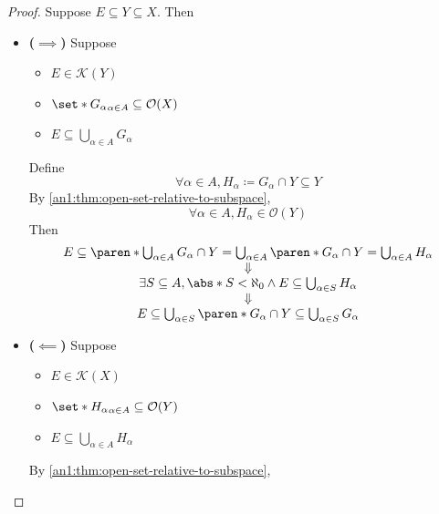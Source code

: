 \begin{proof}
  Suppose $E \subseteq Y \subseteq X$. Then
  \begin{itemize}
    \item \textbf{($\implies$)} Suppose
          \begin{itemize}
            \item $E \in \mathcal{K}(Y)$
            \item $\set*{G_{\alpha}}_{\alpha \in A} \subseteq \mathcal{O}(X)$
            \item $E \subseteq \bigcup_{\alpha \in A} G_{\alpha}$
          \end{itemize}
          Define
          \[
            \forall \alpha \in A, H_{\alpha} \coloneqq G_{\alpha} \cap Y \subseteq Y
          \]
          By \cref{an1:thm:open-set-relative-to-subspace},
          \[
            \forall \alpha \in A, H_{\alpha} \in \mathcal{O}(Y)
          \]
          Then
          \[
            \begin{array}{c}
              E \subseteq \paren*{\bigcup_{\alpha \in A} G_{\alpha}} \cap Y =
              \bigcup_{\alpha \in A} \paren*{G_{\alpha} \cap Y} = \bigcup_{\alpha \in A} H_{\alpha}                     \\
              \Downarrow                                                                                                \\
              \exists S \subseteq A, \abs*{S} < \aleph_{0} \land E \subseteq \bigcup_{\alpha \in S} H_{\alpha}          \\
              \Downarrow                                                                                                \\
              E \subseteq \bigcup_{\alpha \in S} \paren*{G_{\alpha} \cap Y} \subseteq \bigcup_{\alpha \in S} G_{\alpha} \\
            \end{array}
          \]
    \item \textbf{($\impliedby$)} Suppose
          \begin{itemize}
            \item $E \in \mathcal{K}(X)$
            \item $\set*{H_{\alpha}}_{\alpha \in A} \subseteq \mathcal{O}(Y)$
            \item $E \subseteq \bigcup_{\alpha \in A} H_{\alpha}$
          \end{itemize}
          By \cref{an1:thm:open-set-relative-to-subspace},
          \[
\]
\end{itemize}
\end{proof}
